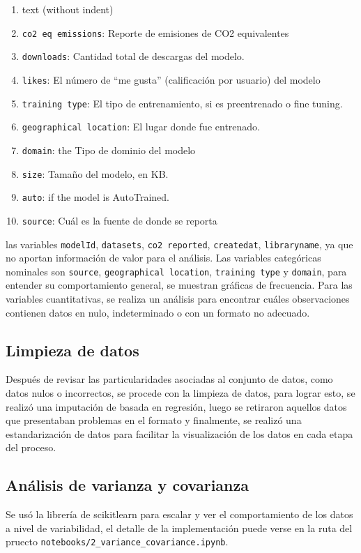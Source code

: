 \documentclass[journal]{IEEEtran}
\begin{document}
	\begin{enumerate}
		\item[]\hspace{-\labelwidth}\hspace{-\labelsep}text (without indent)
		\item \texttt{co2 eq emissions}: Reporte de emisiones de CO2 equivalentes
		\item \texttt{downloads}: Cantidad total de descargas del modelo.
		\item \texttt{likes}: El número de “me gusta” (calificación por usuario) del modelo
		\item \texttt{training type}: El tipo de entrenamiento, si es preentrenado o fine tuning.
		\item \texttt{geographical location}: El lugar donde fue entrenado.
		\item \texttt{domain}: the Tipo de dominio del modelo
		\item \texttt{size}: Tamaño del modelo, en KB.
		\item \texttt{auto}: if the model is AutoTrained.
		\item \texttt{source}: Cuál es la fuente de donde se reporta
	\end{enumerate}
	las variables \texttt{modelId}, \texttt{datasets}, \texttt{co2 reported}, \texttt{createdat}, \texttt{libraryname}, ya que no aportan información de valor para el análisis.
	Las variables categóricas nominales son  \texttt{source}, \texttt{geographical location}, \texttt{training type} y \texttt{domain}, para entender su comportamiento general, se muestran gráficas de frecuencia. Para las variables cuantitativas, se realiza un análisis para encontrar cuáles observaciones contienen datos en nulo, indeterminado o con un formato no adecuado.

	\subsection{Limpieza de datos}
	\label{ssec:pca}
	Después de revisar las particularidades asociadas al conjunto de datos, como datos nulos o incorrectos, se procede con la limpieza de datos, para lograr esto, se realizó una imputación de basada en regresión, luego se retiraron aquellos datos que presentaban problemas en el formato y finalmente, se realizó una estandarización de datos para facilitar la visualización de los datos en cada etapa del proceso.
	\subsection{Análisis de varianza y covarianza}
	\label{ssec:pca}
	Se usó la librería de scikitlearn para escalar y ver el comportamiento de los datos a nivel de variabilidad, el detalle de la implementación puede verse en la ruta del pruecto \texttt{notebooks/2\_variance\_covariance.ipynb}.
\end{document}
